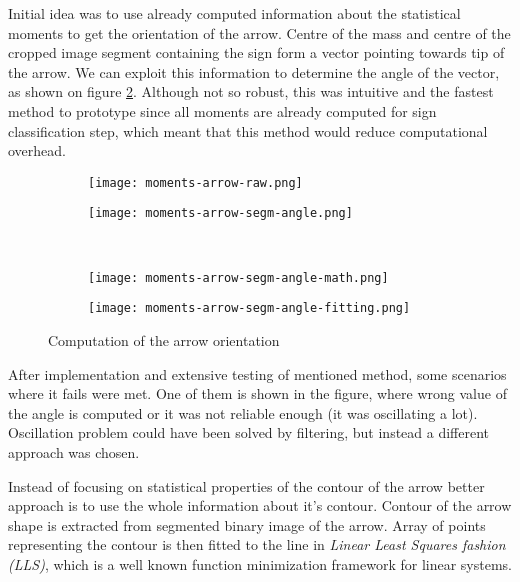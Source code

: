 Initial idea was to use already computed information about the statistical moments to get the orientation of the arrow. Centre of the mass and centre of the cropped image segment containing the sign form a vector pointing towards tip of the arrow. We can exploit this information to determine the angle of the vector, as shown on figure \ref{fig:arrow-angle-computation}. Although not so robust, this was intuitive and the fastest method to prototype since all moments are already computed for sign classification step, which meant that this method would reduce computational overhead.

\begin{figure}[th!]
	\centering
	\begin{subfigure}[b]{0.45\textwidth}
		\centering
		\texttt{[image: moments-arrow-raw.png]}
	\end{subfigure}
	\begin{subfigure}[b]{0.45\textwidth}
		\centering
		\texttt{[image: moments-arrow-segm-angle.png]}
	\end{subfigure}
	~
	\begin{subfigure}[b]{0.45\textwidth}
		\centering
		\texttt{[image: moments-arrow-segm-angle-math.png]}
	\end{subfigure}
	\begin{subfigure}[b]{0.45\textwidth}
		\centering
		\texttt{[image: moments-arrow-segm-angle-fitting.png]}
		\label{fig:line-fitting}
	\end{subfigure}
	\caption{Computation of the arrow orientation}
	\label{fig:arrow-angle-computation}
\end{figure}

After implementation and extensive testing of mentioned method, some scenarios where it fails were met. One of them is shown in the figure, where wrong value of the angle is computed or it was not reliable enough (it was oscillating a lot). Oscillation problem could have been solved by filtering, but instead a different approach was chosen.

Instead of focusing on statistical properties of the contour of the arrow better approach is to use the whole information about it's contour. Contour of the arrow shape is extracted from segmented binary image of the arrow. Array of points representing the contour is then fitted to the line in \textit{Linear Least Squares fashion (LLS)}, which is a well known function minimization framework for linear systems.

